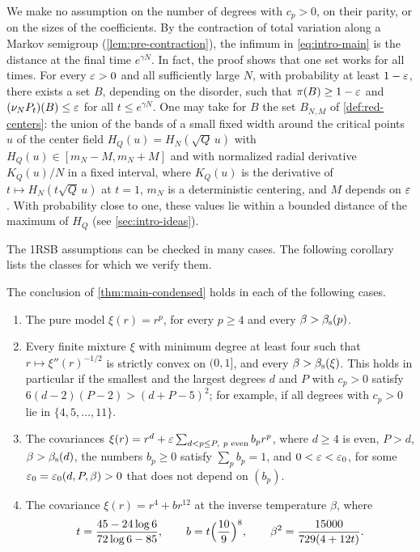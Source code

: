 We make no assumption on the number of degrees with $c_p>0$, on their parity, or on the sizes of the coefficients. By the contraction of total variation along a Markov semigroup (\cref{lem:pre-contraction}), the infimum in \eqref{eq:intro-main} is the distance at the final time $e^{\gamma N}$. In fact, the proof shows that one set works for all times. For every $\varepsilon>0$ and all sufficiently large $N$, with probability at least $1-\varepsilon$, there exists a set $B$, depending on the disorder, such that $\pi(B)\ge1-\varepsilon$ and $(\nu_NP_t)(B)\le\varepsilon$ for all $t\le e^{\gamma N}$. One may take for $B$ the set $B_{N,M}$ of \cref{def:red-centers}: the union of the bands of a small fixed width around the critical points $u$ of the center field $H_Q(u)=H_N(\sqrt Q\,u)$ with $H_Q(u)\in[m_N-M,m_N+M]$ and with normalized radial derivative $K_Q(u)/N$ in a fixed interval, where $K_Q(u)$ is the derivative of $t\mapsto H_N(t\sqrt Q\,u)$ at $t=1$, $m_N$ is a deterministic centering, and $M$ depends on $\varepsilon$. With probability close to one, these values lie within a bounded distance of the maximum of $H_Q$ (see \cref{sec:intro-ideas}).

The 1RSB assumptions can be checked in many cases. The following corollary lists the classes for which we verify them.

\begin{corollary}\label{cor:main-classes}
The conclusion of \cref{thm:main-condensed} holds in each of the following cases.
\begin{enumerate}[label=(\alph*)]
\item The pure model $\xi(r)=r^p$, for every $p\ge4$ and every $\beta>\beta_{\mathrm s}(p)$.
\item Every finite mixture $\xi$ with minimum degree at least four such that $r\mapsto\xi''(r)^{-1/2}$ is strictly convex on $(0,1]$, and every $\beta>\beta_{\mathrm s}(\xi)$. This holds in particular if the smallest and the largest degrees $d$ and $P$ with $c_p>0$ satisfy $6(d-2)(P-2)>(d+P-5)^2$; for example, if all degrees with $c_p>0$ lie in $\{4,5,\dots,11\}$.
\item The covariances $\xi(r)=r^d+\varepsilon\sum_{d<p\le P,\ p\text{ even}}b_pr^p$, where $d\ge4$ is even, $P>d$, $\beta>\beta_{\mathrm s}(d)$, the numbers $b_p\ge0$ satisfy $\sum_pb_p=1$, and $0<\varepsilon<\varepsilon_0$, for some $\varepsilon_0=\varepsilon_0(d,P,\beta)>0$ that does not depend on $(b_p)$.
\item The covariance $\xi(r)=r^4+br^{12}$ at the inverse temperature $\beta$, where
\begin{equation*}
t=\frac{45-24\log6}{72\log6-85},\qquad b=t\Bigl(\frac{10}9\Bigr)^8,\qquad\beta^2=\frac{15000}{729(4+12t)}.
\end{equation*}
\end{enumerate}
\end{corollary}

